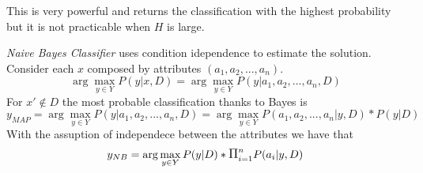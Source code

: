 This is very powerful and returns the classification with the highest probability but it is not practicable when $H$ is large.

{\em Naive Bayes Classifier} uses condition idependence to estimate the solution.
Consider each $x$ composed by attributes $(a_1, a_2, ..., a_n)$.
\[
\arg\max_{y \in Y}P(y|x,D) = \arg\max_{y \in Y}P(y|a_1, a_2, ..., a_n,D)
\]
For $x' \notin D$ the most probable classification thanks to Bayes is
\[
y_{MAP} = \arg\max_{y \in Y}P(y|a_1, a_2, ..., a_n,D) = \arg\max_{y \in Y}P(a_1, a_2, ..., a_n| y, D)*P(y|D)
\]
With the assuption of independece between the attributes we have that
\[
y_{NB} = \arg\max_{y \in Y}P(y|D) * \mathlarger{\Pi}_{i=1}^n P(a_i|y,D)
\]





